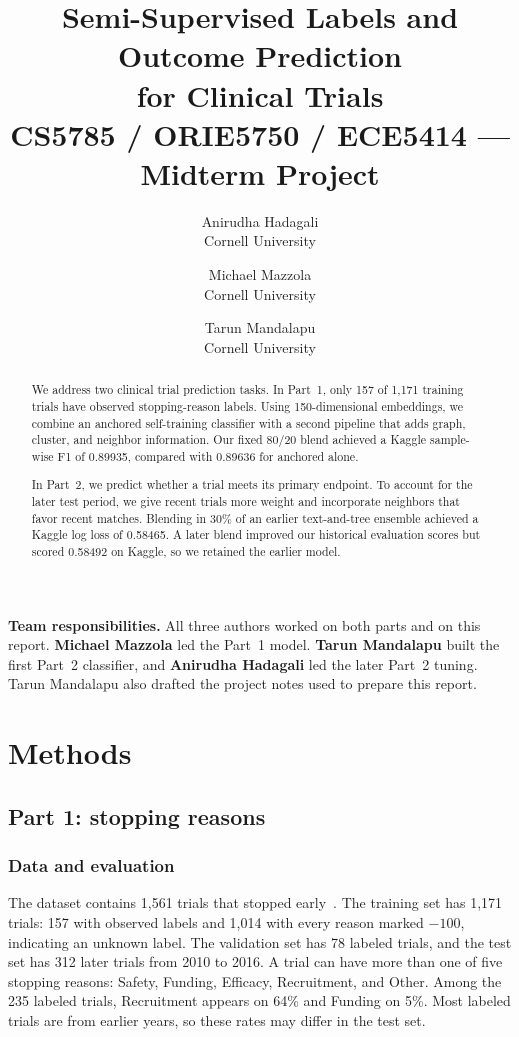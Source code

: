 \documentclass[10pt,twocolumn,letterpaper]{article}
\title{Semi-Supervised Labels and Outcome Prediction\\
for Clinical Trials\\
\vspace{0.35em}
\large CS5785 / ORIE5750 / ECE5414 --- Midterm Project}
\author{Anirudha Hadagali\\
Cornell University
\and
Michael Mazzola\\
Cornell University
\and
Tarun Mandalapu\\
Cornell University
}
\begin{document}
\maketitle

\begin{abstract}
We address two clinical trial prediction tasks. In Part~1, only 157 of 1,171
training trials have observed stopping-reason labels. Using 150-dimensional
embeddings, we combine an anchored self-training classifier with a second
pipeline that adds graph, cluster, and neighbor information. Our fixed 80/20
blend achieved a Kaggle sample-wise F1 of 0.89935, compared with 0.89636 for
anchored alone.

In Part~2, we predict whether a trial meets its primary endpoint. To account
for the later test period, we give recent trials more weight and incorporate
neighbors that favor recent matches. Blending in 30\% of an earlier
text-and-tree ensemble achieved a Kaggle log loss of 0.58465. A later blend
improved our historical evaluation scores but scored 0.58492 on Kaggle, so we
retained the earlier model.

\end{abstract}

\noindent\textbf{Team responsibilities.}
All three authors worked on both parts and on this report.
\textbf{Michael Mazzola} led the Part~1 model.
\textbf{Tarun Mandalapu} built the first Part~2 classifier, and
\textbf{Anirudha Hadagali} led the later Part~2 tuning.
Tarun Mandalapu also drafted the project notes used to prepare this report.

\section{Methods}
\label{sec:methods}

\subsection{Part 1: stopping reasons}
\label{sec:p1}

\subsubsection{Data and evaluation}

The dataset contains 1,561 trials that stopped early~\cite{fu2022hint,clinicaltrials}.
The training set has 1,171 trials: 157 with observed labels and 1,014 with every
reason marked $-100$, indicating an unknown label. The validation set has 78
labeled trials, and the test set has 312 later trials from 2010 to 2016.
A trial can have more than one of five stopping reasons: Safety, Funding,
Efficacy, Recruitment, and Other. Among the 235 labeled trials, Recruitment
appears on 64\% and Funding on 5\%. Most labeled trials are from earlier years,
so these rates may differ in the test set.
\end{document}
